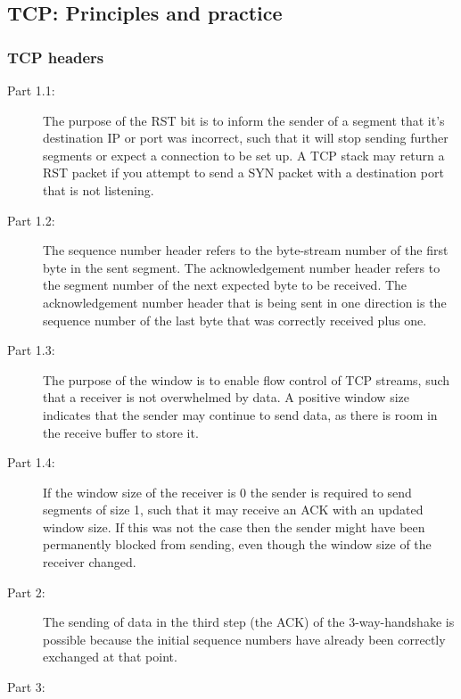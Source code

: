 \subsection{TCP: Principles and practice}
\subsubsection{TCP headers}
\begin{description}
    \item[Part 1.1:] The purpose of the RST bit is to inform the sender of a segment that it's destination IP or port was
        incorrect, such that it will stop sending further segments or expect a connection to be set up. A TCP stack may return
        a RST packet if you attempt to send a SYN packet with a destination port that is not listening.
    \item[Part 1.2:] The sequence number header refers to the byte-stream number of the first byte in the sent segment. The
        acknowledgement number header refers to the segment number of the next expected byte to be received. The acknowledgement
        number header that is being sent in one direction is the sequence number of the last byte that was correctly received
        plus one. %
    \item[Part 1.3:] The purpose of the window is to enable flow control of TCP streams, such that a receiver is not overwhelmed
        by data. A positive window size indicates that the sender may continue to send data, as there is room in the receive buffer
        to store it.
    \item[Part 1.4:] If the window size of the receiver is 0 the sender is required to send segments of size 1, such
        that it may receive an ACK with an updated window size. If this was not the case then the sender might have been
        permanently blocked from sending, even though the window size of the receiver changed.
    \item[Part 2:] The sending of data in the third step (the ACK) of the 3-way-handshake is possible because the initial
        sequence numbers have already been correctly exchanged at that point. %
    \item[Part 3:] %
\end{description}

